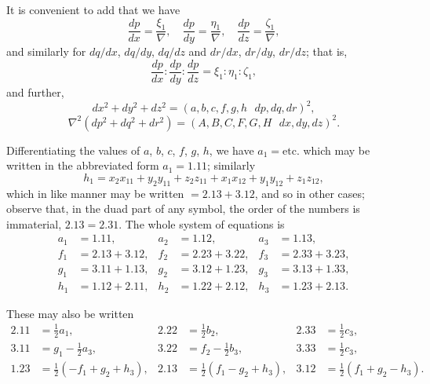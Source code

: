 \documentclass[11pt,a4paper]{article}
\theoremstyle{definition}
\theoremstyle{remark}
\begin{document}
It is convenient to add that we have
\[
\frac{dp}{dx} = \frac{\xi_1}{\nabla}, \quad \frac{dp}{dy} = \frac{\eta_1}{\nabla}, \quad \frac{dp}{dz} = \frac{\zeta_1}{\nabla},
\]
and similarly for $dq/dx$, $dq/dy$, $dq/dz$ and $dr/dx$, $dr/dy$, $dr/dz$; that is,
\[
\frac{dp}{dx} : \frac{dp}{dy} : \frac{dp}{dz} = \xi_1 : \eta_1 : \zeta_1,
\]
and further,
\[
dx^2 + dy^2 + dz^2 = (a, b, c, f, g, h \,\!\!\!\!\!\! \, \, \, d p, dq, dr)^2,
\]
\[
\nabla^2(dp^2 + dq^2 + dr^2) = (A, B, C, F, G, H \,\!\!\!\!\!\! \, \, \, d x, dy, dz)^2.
\]

Differentiating the values of $a$, $b$, $c$, $f$, $g$, $h$, we have $a_1 = \text{etc.}$ which may be written in the abbreviated form $a_1 = 1.11$; similarly
\[
h_1 = x_2 x_{11} + y_2 y_{11} + z_2 z_{11} + x_1 x_{12} + y_1 y_{12} + z_1 z_{12},
\]
which in like manner may be written $= 2.13 + 3.12$, and so in other cases; observe that, in the duad part of any symbol, the order of the numbers is immaterial, $2.13 = 2.31$. The whole system of equations is
\[
\begin{aligned}
a_1 &= 1.11, & a_2 &= 1.12, & a_3 &= 1.13, \\
f_1 &= 2.13 + 3.12, & f_2 &= 2.23 + 3.22, & f_3 &= 2.33 + 3.23, \\
g_1 &= 3.11 + 1.13, & g_2 &= 3.12 + 1.23, & g_3 &= 3.13 + 1.33, \\
h_1 &= 1.12 + 2.11, & h_2 &= 1.22 + 2.12, & h_3 &= 1.23 + 2.13.
\end{aligned}
\]

These may also be written
\[
\begin{aligned}
2.11 &= \tfrac{1}{2}a_1, & 2.22 &= \tfrac{1}{2}b_2, & 2.33 &= \tfrac{1}{2}c_3, \\
3.11 &= g_1 - \tfrac{1}{2}a_3, & 3.22 &= f_2 - \tfrac{1}{2}b_3, & 3.33 &= \tfrac{1}{2}c_3, \\
1.23 &= \tfrac{1}{2}(-f_1 + g_2 + h_3), & 2.13 &= \tfrac{1}{2}(f_1 - g_2 + h_3), & 3.12 &= \tfrac{1}{2}(f_1 + g_2 - h_3).
\end{aligned}
\]
\end{document}
